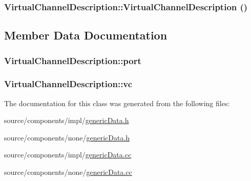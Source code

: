 \hypertarget{classVirtualChannelDescription_289d22640be56f23605294589d924607}{
\subsubsection[{VirtualChannelDescription}]{\setlength{\rightskip}{0pt plus 5cm}VirtualChannelDescription::VirtualChannelDescription ()}}
\label{classVirtualChannelDescription_289d22640be56f23605294589d924607}




\subsection{Member Data Documentation}
\hypertarget{classVirtualChannelDescription_f9d604a874c2a0239eb9a63dbf95308e}{
\subsubsection[{port}]{ {\bf VirtualChannelDescription::port}}}
\label{classVirtualChannelDescription_f9d604a874c2a0239eb9a63dbf95308e}


\hypertarget{classVirtualChannelDescription_efa589385b11e2b9450ed4132964bc71}{
\subsubsection[{vc}]{ {\bf VirtualChannelDescription::vc}}}
\label{classVirtualChannelDescription_efa589385b11e2b9450ed4132964bc71}




The documentation for this class was generated from the following files:\begin{CompactItemize}
\item 
source/components/impl/\hyperlink{impl_2genericData_8h}{genericData.h}\item 
source/components/none/\hyperlink{none_2genericData_8h}{genericData.h}\item 
source/components/impl/\hyperlink{impl_2genericData_8cc}{genericData.cc}\item 
source/components/none/\hyperlink{none_2genericData_8cc}{genericData.cc}\end{CompactItemize}
